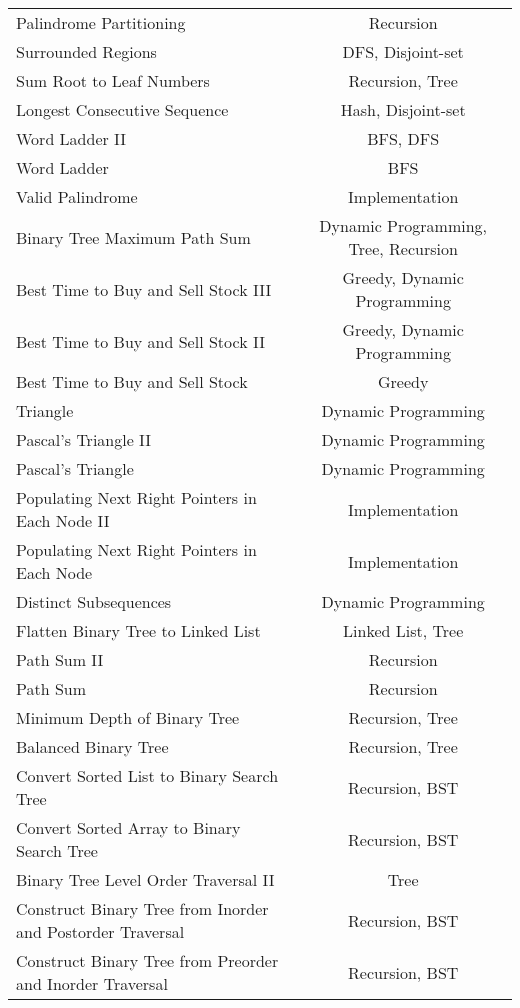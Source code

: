 \documentclass[paper=a4, fontsize=11pt]{scrartcl} %
\begin{document}
\begin{center}
\begin{longtable}{|l|c|}
    Palindrome Partitioning &   Recursion   \\
    Surrounded Regions  &   DFS, Disjoint-set    \\
    Sum Root to Leaf Numbers    &   Recursion, Tree   \\
    Longest Consecutive Sequence    &   Hash, Disjoint-set    \\
    Word Ladder II  &   BFS, DFS    \\
    Word Ladder &   BFS \\
    Valid Palindrome    &   Implementation  \\
    Binary Tree Maximum Path Sum    &   Dynamic Programming, Tree, Recursion \\
    Best Time to Buy and Sell Stock III &   Greedy, Dynamic Programming \\
    Best Time to Buy and Sell Stock II  &   Greedy, Dynamic Programming \\
    Best Time to Buy and Sell Stock &   Greedy  \\
    Triangle    &   Dynamic Programming    \\
    Pascal's Triangle II    &   Dynamic Programming \\
    Pascal's Triangle   &   Dynamic Programming \\
    Populating Next Right Pointers in Each Node II  &   Implementation  \\
    Populating Next Right Pointers in Each Node &   Implementation  \\
    Distinct Subsequences   &   Dynamic Programming \\
    Flatten Binary Tree to Linked List  &   Linked List, Tree\\
    Path Sum II &   Recursion   \\
    Path Sum    &   Recursion   \\
    Minimum Depth of Binary Tree    &   Recursion, Tree   \\
    Balanced Binary Tree    &   Recursion, Tree   \\
    Convert Sorted List to Binary Search Tree   &   Recursion, BST \\
    Convert Sorted Array to Binary Search Tree  &   Recursion, BST  \\
    Binary Tree Level Order Traversal II    &   Tree  \\
    Construct Binary Tree from Inorder and Postorder Traversal  &   Recursion, BST  \\
    Construct Binary Tree from Preorder and Inorder Traversal   &   Recursion, BST  \\

\end{longtable}
\end{center}
\end{document}
